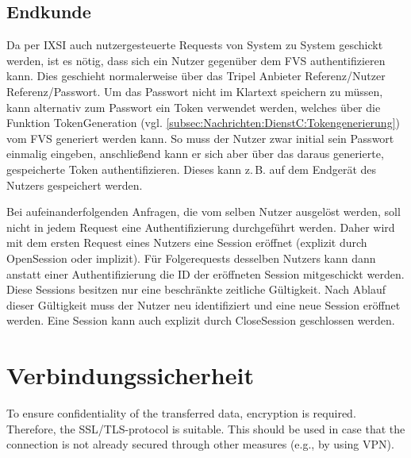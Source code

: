 \subsection*{Endkunde}
Da per IXSI auch nutzergesteuerte Requests von System zu System geschickt werden, ist
es nötig, dass sich ein Nutzer gegenüber dem FVS authentifizieren kann.
Dies geschieht normalerweise über das Tripel Anbieter Referenz/Nutzer Referenz/Passwort. Um das  Passwort nicht im Klartext speichern zu müssen, kann alternativ zum Passwort ein Token
verwendet werden, welches über die Funktion TokenGeneration (vgl. \cref{subsec:Nachrichten:DienstC:Tokengenerierung}) vom FVS
generiert werden kann. So muss der Nutzer zwar initial sein Passwort einmalig eingeben, anschließend kann er sich aber über das daraus generierte, gespeicherte Token
authentifizieren. Dieses kann z.\,B. auf dem Endgerät des Nutzers gespeichert werden.

Bei aufeinanderfolgenden Anfragen, die vom selben Nutzer ausgelöst werden, soll nicht in jedem Request eine Authentifizierung durchgeführt werden. Daher wird mit dem ersten Request eines Nutzers eine Session eröffnet (explizit durch OpenSession oder implizit). Für Folgerequests desselben Nutzers kann dann anstatt einer Authentifizierung die ID der eröffneten Session mitgeschickt werden. Diese Sessions besitzen nur eine beschränkte zeitliche Gültigkeit. Nach Ablauf dieser Gültigkeit muss der Nutzer neu identifiziert und eine neue Session eröffnet werden. Eine Session kann auch explizit durch CloseSession
geschlossen werden.

\section{Verbindungssicherheit}
To ensure confidentiality of the transferred data, encryption is required. Therefore, the SSL/TLS-protocol is suitable. This should be used in case that the connection is not already secured through other measures (e.g., by using VPN).